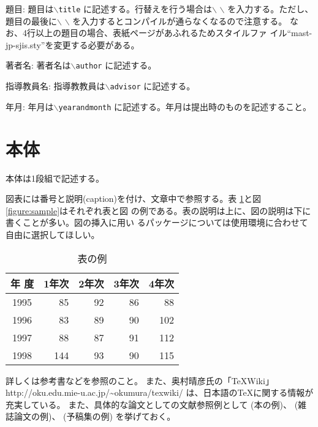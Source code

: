 \documentclass[a4paper,11pt]{jreport}
\begin{document}
\begin{description} \parskip=1pt
\item{題目: }
題目は{\tt $\backslash$title} に記述する。行替えを行う場合は$\backslash$
	   $\backslash$ を入力する。ただし、題目の最後に$\backslash$
	   $\backslash$ を入力するとコンパイルが通らなくなるので注意する。
	   なお、4行以上の題目の場合、表紙ページがあふれるためスタイルファ
	   イル``mast-jp-sjis.sty''を変更する必要がある。
\item{著者名: }
著者名は{\tt $\backslash$author} に記述する。
\item{指導教員名: }
指導教教員は{\tt $\backslash$advisor} に記述する。
\item{年月: }
年月は{\tt $\backslash$yearandmonth} に記述する。年月は提出時のものを記述すること。
\end{description}

\section{本体}

本体は1段組で記述する。

図表には番号と説明(caption)を付け、文章中で参照する。表
\ref{table:fundamental_data_type}と図\ref{figure:sample}はそれぞれ表と図
の例である。表の説明は上に、図の説明は下に書くことが多い。図の挿入に用い
るパッケージについては使用環境に合わせて自由に選択してほしい。

\begin{table}[hbt]
\caption{表の例}
\label{table:fundamental_data_type}
\begin{center}
\begin{tabular}{| c | r | r | r | r |}
\hline
年 度 & 1年次 & 2年次 & 3年次 & 4年次 \\
\hline
1995 & 85 & 92 & 86 & 88 \\
1996 & 83 & 89 & 90 & 102 \\
1997 & 88 & 87 & 91 & 112 \\
1998 & 144 & 93 & 90 & 115 \\
\hline 
\end{tabular}
\end{center}
\end{table}
\medskip


詳しくは参考書\cite{okumura2010,yoshinaga2009}などを参照のこと。
また、奥村晴彦氏の「\TeX Wiki」
http://oku.edu.mie-u.ac.jp/\textasciitilde{}okumura/texwiki/
は、日本語の\TeX に関する情報が充実している。
また、具体的な論文としての文献参照例として
(本の例)\cite{ware2004}、
(雑誌論文の例)\cite{meyer2009}、
(予稿集の例)\cite{hill2010}
を挙げておく。
\end{document}
